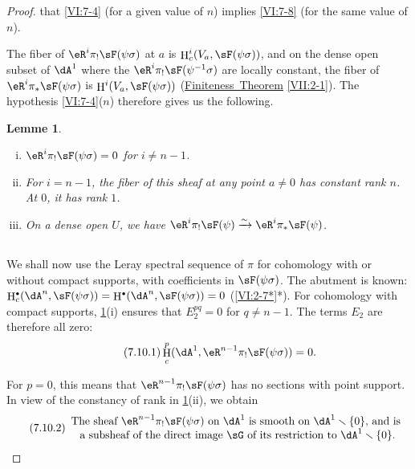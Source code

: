 \documentclass[oneside]{book}
\DeclareMathOperator{\h}{H}
\newcommand{\iso}{\xrightarrow\sim}
\renewcommand{\setminus}{\smallsetminus}
\theoremstyle{sga-source}
\theoremstyle{sga-source-dash}
\theoremstyle{sga-source-dotdash}
\theoremstyle{sga-source-number-note-dash}
\theoremstyle{sga-source-note-number-dotdash}
\theoremstyle{sga-source-example-dotdash}
\theoremstyle{sga-source-inline-number}
\theoremstyle{sga-source-bare-number}
\theoremstyle{sga-source}
\newtheorem{lemma_}[subsection]{Lemme}
\let\oldbullet\bullet
\renewcommand{\bullet}{\textnormal{\tiny$\oldbullet$}}
\begin{document}
\begin{proof}[Proof]
that \ref{VI:7-4} (for a given value of $n$) implies \ref{VI:7-8} 
(for the same value of $n$). 

The fiber of $\eR^i \pi_! \sF(\psi\sigma)$ at $a$ is 
$\h_c^i(V_a,\sF(\psi\sigma))$, and on the dense open subset of $\dA^1$ where the 
  $\eR^i \pi_!\sF(\psi^{-1}\sigma)$ are locally constant, the fiber of 
$\eR^i \pi_\ast \sF(\psi\sigma)$ is $\h^i(V_a,\sF(\psi\sigma))$ 
(\hyperref[VII]{Finiteness\ Theorem} \ref{VII:2-1}). The hypothesis \ref{VI:7-4}($n$) 
therefore gives us the following. 





\begin{lemma_}\label{VI:7-9}
\begin{enumerate}[(i)]
  \item $\eR^i \pi_! \sF(\psi\sigma)=0$ for $i\ne n-1$. 
  \item For $i=n-1$, the fiber of this sheaf at any point $a\ne 0$ has 
    constant rank $n$. At $0$, it has rank $1$. 
  \item On a dense open $U$, we have 
    $\eR^i \pi_! \sF(\psi) \iso \eR^i \pi_\ast \sF(\psi)$. 
\end{enumerate}
\end{lemma_}





\subsection{}\label{VI:7-10}

We shall now use the Leray spectral sequence of $\pi$ for 
cohomology with or without compact supports, with coefficients in $\sF(\psi\sigma)$. 
The abutment is known: 
$\h_c^\bullet(\dA^n,\sF(\psi\sigma))=\h^\bullet(\dA^n,\sF(\psi\sigma)) = 0$ 
(\ref{VI:2-7*}*). For cohomology with compact supports, \ref{VI:7-9}(i) ensures that 
$E_2^{pq}=0$ for $q\ne n-1$. The terms $E_2$ are therefore all zero: 
\begin{equation*}\tag{7.10.1}\label{VI:eq:7-10-1}
  \h_c^p(\dA^1,\eR^{n-1} \pi_!\sF(\psi\sigma)) = 0 \text{.} 
\end{equation*}

  For $p=0$, this means that $\eR^{n-1}\pi_! \sF(\psi\sigma)$ has no sections 
with point support. In view of the constancy of rank in \ref{VI:7-9}(ii), we obtain 
\begin{equation*}\tag{7.10.2}\label{VI:eq:7-10-2}
  \begin{array}{c}
    \text{The sheaf $\eR^{n-1} \pi_! \sF(\psi\sigma)$ on $\dA^1$ is smooth on $\dA^1\setminus \{0\}$, and is } \\ 
    \text{a subsheaf of the direct image $\sG$ of its restriction to $\dA^1\setminus \{0\}$.}
  \end{array}
\end{equation*}


\end{proof}
\end{document}

